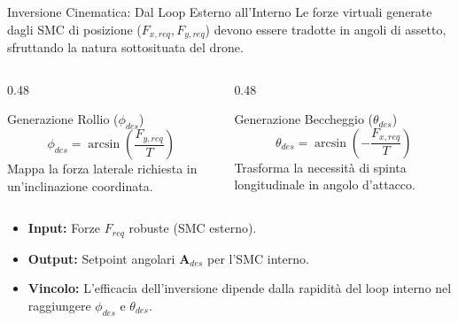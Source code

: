 \documentclass[aspectratio=169]{beamer} %
\begin{document}
\begin{frame}{Inversione Cinematica: Dal Loop Esterno all'Interno}
    Le forze virtuali generate dagli SMC di posizione ($F_{x,req}, F_{y,req}$) devono essere tradotte in angoli di assetto, sfruttando la natura sottosituata del drone.
    
    \vspace{0.4cm}
    \begin{columns}[c]
        \begin{column}{0.48\textwidth}
            \begin{block}{Generazione Rollio ($\phi_{des}$)}
                \begin{equation*}
                    \phi_{des} = \arcsin\left( \frac{F_{y,req}}{T} \right)
                \end{equation*}
                Mappa la forza laterale richiesta in un'inclinazione coordinata.
            \end{block}
        \end{column}
        
        \hfill 
        
        \begin{column}{0.48\textwidth}
            \begin{block}{Generazione Beccheggio ($\theta_{des}$)}
                \begin{equation*}
                    \theta_{des} = \arcsin\left( - \frac{F_{x,req}}{T} \right)
                \end{equation*}
                Trasforma la necessità di spinta longitudinale in angolo d'attacco.
            \end{block}
        \end{column}
    \end{columns}
    
    \vspace{0.4cm}
    \begin{itemize}
        \item \textbf{Input:} Forze $F_{req}$ robuste (SMC esterno).
        \item \textbf{Output:} Setpoint angolari $\mathbf{A}_{des}$ per l'SMC interno.
        \item \textbf{Vincolo:} L'efficacia dell'inversione dipende dalla rapidità del loop interno nel raggiungere $\phi_{des}$ e $\theta_{des}$.
    \end{itemize}
\end{frame}
\end{document}

